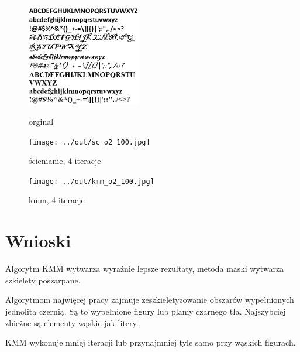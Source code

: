 \documentclass[a4paper,12pt]{article}
\begin{document}
\begin{figure}[h!]
\begin{minipage}[t]{5cm}
\begin{center}
\includegraphics[width=5cm]{../in/o2.jpg}
\caption{orginal}
\end{center}
\end{minipage}
\hfill
\begin{minipage}[t]{5cm}
\begin{center}
\texttt{[image: ../out/sc\_o2\_100.jpg]}
\caption{ścienianie, 4 iteracje}
\end{center}
\end{minipage}
\hfill
\begin{minipage}[t]{5cm}
\begin{center}	
\texttt{[image: ../out/kmm\_o2\_100.jpg]}
\caption{kmm, 4 iteracje}	
\end{center}
\end{minipage}
\end{figure}


\newpage	
\section{Wnioski}
Algorytm KMM wytwarza wyraźnie lepsze rezultaty, metoda maski wytwarza szkielety poszarpane.

Algorytmom najwięcej pracy zajmuje zeszkieletyzowanie obszarów wypełnionych jednolitą czernią. Są to wypełnione figury lub plamy czarnego tła. Najszybciej zbieżne są elementy wąskie jak litery.

KMM wykonuje mniej iteracji lub przynajmniej tyle samo przy wąskich figurach. 
\end{document}
